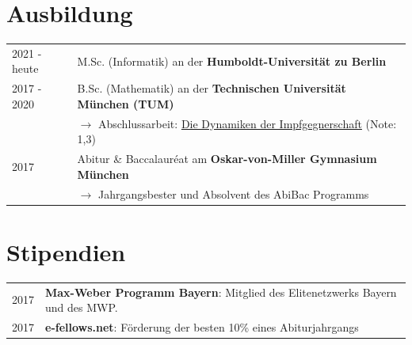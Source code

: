 \documentclass[a4paper,12pt]{article}
\begin{document}
\section{Ausbildung}
\begin{tabularx}{\linewidth}{@{}l X@{}}	
2021 - heute & M.Sc. (Informatik) an der \textbf{Humboldt-Universität zu Berlin} \hfill \normalsize \\

2017 - 2020 & B.Sc. (Mathematik) an der \textbf{Technischen Universität München (TUM)}\hfill \\ 
&\phantom{ }$\rightarrow$ Abschlussarbeit: \href{https://julienandco.github.io/the-dynamics-of-vaccine-hesitancy/bachelor_thesis_julien_caselmann.pdf}{Die Dynamiken der Impfgegnerschaft} (Note: 1,3) \\
2017 & Abitur \& Baccalauréat am \textbf{Oskar-von-Miller Gymnasium München} \hfill \\
&\phantom{ }$\rightarrow$ Jahrgangsbester und Absolvent des AbiBac Programms
\end{tabularx}

\section{Stipendien}
\begin{tabularx}{\linewidth}{@{}l X@{}}
2017 &  \normalsize{\textbf{Max-Weber Programm Bayern}: Mitglied des Elitenetzwerks Bayern und des MWP.}\\
2017 &  \normalsize{\textbf{e-fellows.net}: Förderung der besten 10\% eines Abiturjahrgangs}\\  
\end{tabularx}

\end{document}
